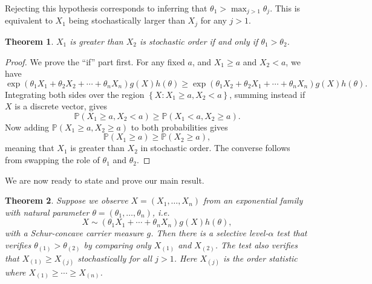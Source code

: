 \documentclass[11pt]{article}
\newtheorem{theorem}{Theorem}
\newcommand{\PP}{\mathbb{P}}
\begin{document}
Rejecting this hypothesis corresponds to inferring that $\theta_1 > \max_{j>1} \theta_j$. This is equivalent to $X_1$ being stochastically larger than $X_j$ for any $j > 1$.

\begin{theorem}
\label{thm:stoch}
$X_1$ is greater than $X_2$ is stochastic order if and only if $\theta_1 > \theta_2$.
\end{theorem}

\begin{proof}

We prove the ``if'' part first. For any fixed $a$, and $X_1 \ge a$ and $X_2 < a$, we have
$$\exp\left(\theta_1 X_1 + \theta_2 X_2 + \cdots + \theta_n X_n\right) g\left(X\right) h\left(\theta\right) \ge \exp\left(\theta_1 X_2 + \theta_2 X_1 + \cdots + \theta_n X_n\right) g\left(X\right) h\left(\theta\right).$$
Integrating both sides over the region $\left\{X: X_1 \ge a, X_2 < a\right\}$, summing instead if $X$ is a discrete vector, gives
$$\PP\left(X_1 \ge a, X_2 < a\right) \ge \PP\left(X_1 < a, X_2 \ge a\right).$$
Now adding $\PP\left(X_1 \ge a, X_2 \ge a\right)$ to both probabilities gives
$$\PP\left(X_1 \ge a\right) \ge \PP\left(X_2 \ge a\right),$$
meaning that $X_1$ is greater than $X_2$ in stochastic order. The converse follows from swapping the role of $\theta_1$ and $\theta_2$.

\end{proof}

We are now ready to state and prove our main result.

\begin{theorem}
Suppose we observe $X = \left(X_1, \ldots, X_n\right)$ from an exponential family with natural parameter $\theta = \left(\theta_1, \ldots, \theta_n\right)$, i.e.
$$X \sim \left(\theta_1 X_1 + \cdots + \theta_n X_n\right) g\left(X\right) h\left(\theta\right),$$
with a Schur-concave carrier measure $g$. Then there is a selective level-$\alpha$ test that verifies $\theta_{\left(1\right)} > \theta_{\left(2\right)}$ by comparing only $X_{\left(1\right)}$ and $X_{\left(2\right)}$. The test also verifies that $X_{\left(1\right)} \ge X_{\left(j\right)}$ stochastically for all $j > 1$. Here $X_{\left(j\right)}$ is the order statistic where $X_{\left(1\right)} \ge \cdots \ge X_{\left(n\right)}$.
\label{thm:main_result}
\end{theorem}
\end{document}
